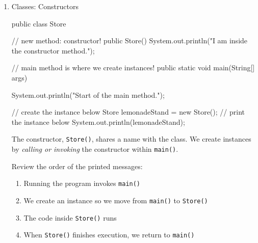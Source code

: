 \documentclass[a4paper,12pt]{article}
\begin{document}
\fontsize{14pt}{15.6pt}
\selectfont

\begin{enumerate}
\item Classes: Constructors
\begin{javacode}
public class Store {
  
  // new method: constructor!
  public Store() {
    System.out.println("I am inside the constructor method.");
  }
  
  // main method is where we create instances!
  public static void main(String[] args) {
    System.out.println("Start of the main method.");
    
    // create the instance below
    Store lemonadeStand = new Store();
    // print the instance below
    System.out.println(lemonadeStand);
  }
}
\end{javacode}
The constructor, \verb|Store()|, shares a name with the class. We create instances by \textit{calling or invoking} the constructor within \verb|main()|.

Review the order of the printed messages:
\renewcommand{\labelenumii}{$\diamond$}
\begin{enumerate}
\item Running the program invokes \verb|main()|

\item We create an instance so we move from \verb|main()| to \verb|Store()|

\item The code inside \verb|Store()| runs

\item When \verb|Store()| finishes execution, we return to \verb|main()|

\end{enumerate}


\end{enumerate}



\end{document}
